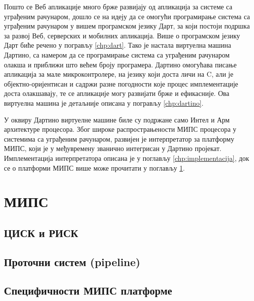\documentclass[12pt,oneside]{memoir}
\begin{document}
Пошто се Веб апликације много брже развијају од апликација за системе са уграђеним рачунаром, дошло се на идеју да се омогући програмирање система са уграђеним рачунаром у вишем програмском језику Дарт, за који постоји подршка за развој Веб, серверских и мобилних апликација. Више о програмском језику Дарт биће речено у погрављу \ref{chp:dart}. Тако је настала виртуелна машина Дартино, са намером да се програмирање система са уграђеним рачунаром олакша и приближи што већем броју програмера. Дартино омогућава писање апликација за мале микроконтролере, на језику који доста личи на C, али је објектно-оријентисан и садржи разне погодности које процес имплементације доста олакшавају, те се апликације могу развијати брже и ефикасније. Ова виртуелна машина је детаљније описана у погрављу \ref{chp:dartino}.

У оквиру Дартино виртуелне машине биле су подржане само Интел и Арм архитектуре процесора. Због широке распрострањености МИПС процесора у системима са уграђеним рачунаром, развијен је интерпретатор за платформу МИПС, који је у међувремену званично интегрисан у Дартино пројекат. Имплементација интерпретатора описана је у поглављу \ref{chp:implementacija}, док се о платформи МИПС више може прочитати у поглављу \ref{chp:mips}.\\




\chapter{МИПС}
\label{chp:mips}

\section{ЦИСК и РИСК}

\section{Проточни систем (pipeline)}

\section{Специфичности МИПС платформе}
\end{document}
